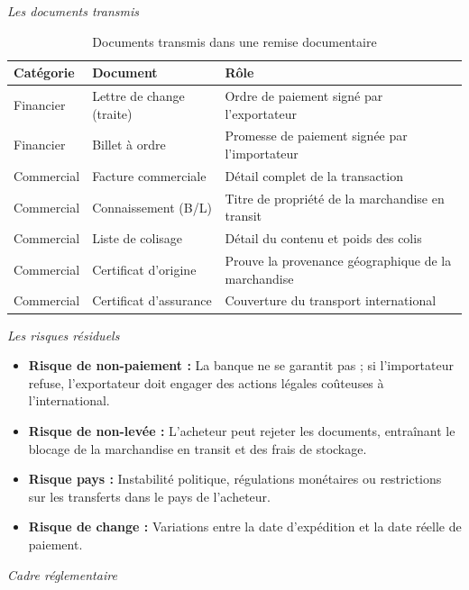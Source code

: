 \documentclass[12pt,a4paper]{report}
\begin{document}
\medskip\textit{Les documents transmis}

\begin{table}[h!]
\centering
\begin{tabularx}{\textwidth}{l l X}
\toprule
Catégorie & Document & Rôle \\
\midrule
Financier & Lettre de change (traite) & Ordre de paiement signé par l'exportateur \\
Financier & Billet à ordre & Promesse de paiement signée par l'importateur \\
Commercial & Facture commerciale & Détail complet de la transaction \\
Commercial & Connaissement (B/L) & Titre de propriété de la marchandise en transit \\
Commercial & Liste de colisage & Détail du contenu et poids des colis \\
Commercial & Certificat d'origine & Prouve la provenance géographique de la marchandise \\
Commercial & Certificat d'assurance & Couverture du transport international \\
\bottomrule
\end{tabularx}
\caption{Documents transmis dans une remise documentaire}
\end{table}

\medskip\textit{Les risques résiduels}

\begin{itemize}
  \item \textbf{Risque de non-paiement :} La banque ne se garantit pas ; si l'importateur refuse, l'exportateur doit engager des actions légales coûteuses à l'international.
  \item \textbf{Risque de non-levée :} L'acheteur peut rejeter les documents, entraînant le blocage de la marchandise en transit et des frais de stockage.
  \item \textbf{Risque pays :} Instabilité politique, régulations monétaires ou restrictions sur les transferts dans le pays de l'acheteur.
  \item \textbf{Risque de change :} Variations entre la date d'expédition et la date réelle de paiement.
\end{itemize}

\medskip\textit{Cadre réglementaire}
\end{document}
